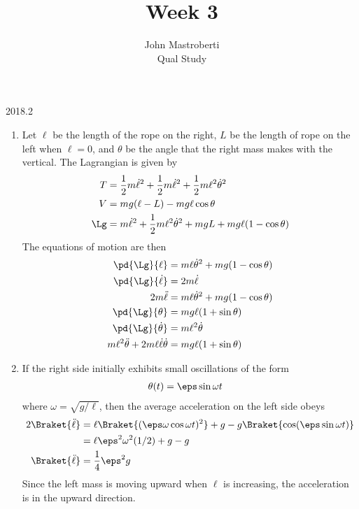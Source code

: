 \documentclass[12pt]{article}
\begin{document}
\title{Week 3}
\author{John Mastroberti\\
Qual Study}

\maketitle

\begin{solution}{2018.2}
\begin{enumerate}
\item
Let $\ell$ be the length of the rope on the right,
$L$ be the length of rope on the left when $\ell = 0$,
and $\theta$ be the angle that the right mass makes with the vertical.
The Lagrangian is given by
\begin{align*}
T & = \frac{1}{2} m \dot{\ell}^2 + \frac{1}{2} m \dot{\ell}^2 + \frac{1}{2} m \ell^2 \dot{\theta}^{2} \\
V & = mg(\ell - L) - mg\ell \cos \theta \\
\Lg & = m\dot{\ell}^{2} + \frac{1}{2} m\ell^{2} \dot{\theta}^{2} + mgL + mg\ell (1 -\cos \theta) \\
\end{align*}
The equations of motion are then
\begin{align*}
\pd{\Lg}{\ell} & = m\ell \dot{\theta}^{2} + mg (1 - \cos \theta) \\
\pd{\Lg}{\dot{\ell}} & = 2m\dot{\ell} \\
2m \ddot{\ell} & = m\ell \dot{\theta}^{2} + mg (1 - \cos \theta) \\
\pd{\Lg}{\theta} & = mg\ell (1 + \sin \theta) \\
\pd{\Lg}{\dot{\theta}} & = m\ell^{2} \dot{\theta} \\
m\ell^{2} \ddot{\theta} + 2m\ell \dot{\ell} \dot{\theta} & = mg\ell (1 + \sin \theta)
\end{align*}


\item
If the right side initially exhibits small oscillations of the form
\begin{align*}
  \theta(t) & = \eps \sin \omega t
\end{align*}
where $\omega = \sqrt{g/\ell}$, then the average acceleration on the left side obeys
\begin{align*}
  2\Braket{\ddot{\ell}} & = \ell \Braket{(\eps \omega \cos \omega t)^{2}} + g - g \Braket{\cos(\eps \sin \omega t)} \\
  & = \ell \eps^{2} \omega^{2} (1/2) + g - g \\
  \Braket{\ddot{\ell}} & = \frac{1}{4} \eps^{2} g
\end{align*}
Since the left mass is moving upward when $\ell$ is increasing, the acceleration is in the upward direction.



\end{enumerate}
\end{solution}
\end{document}
